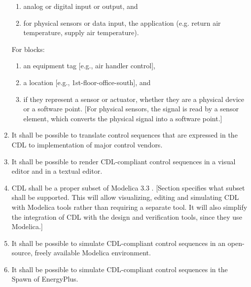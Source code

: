 \documentclass[letterpaper,10pt, openany,english]{sphinxmanual}
\begin{document}
\begin{enumerate}
\begin{enumerate}
\item {} 
analog or digital input or output, and

\item {} 
for physical sensors or data input, the application
(e.g. return air temperature, supply air temperature).

\end{enumerate}

For blocks:
\begin{enumerate}
\def\theenumii{\arabic{enumii}}
\def\labelenumii{\theenumii .}
\makeatletter\def\p@enumiii{\p@enumii \theenumii .}\makeatother
\item {} 
an equipment tag {[}e.g., air handler control{]},

\item {} 
a location {[}e.g., 1st-floor-office-south{]}, and

\item {} 
if they represent a sensor or actuator, whether they are a physical device
or a software point. {[}For physical sensors, the signal is read by
a sensor element, which converts the physical signal into a software point.{]}

\end{enumerate}

\item {} 
It shall be possible to translate control sequences that
are expressed in the CDL
to implementation of major control vendors.

\item {} 
It shall be possible to render CDL-compliant control sequences in a visual editor and in a textual
editor.

\item {} 
CDL shall be a proper subset of Modelica 3.3 .
{[}Section {\hyperref[\detokenize{cdl:sec-cdl}]{}} specifies what subset shall be supported. This will allow visualizing, editing and simulating
CDL with Modelica tools rather than requiring a separate tool.
It will also simplify the integration of CDL with the design and verification tools, since they use Modelica.{]}

\item {} 
It shall be possible to simulate CDL-compliant control sequences in an open-source, freely available
Modelica environment.

\item {} 
It shall be possible to simulate CDL-compliant control sequences in the Spawn of EnergyPlus.


\end{enumerate}
\end{document}
